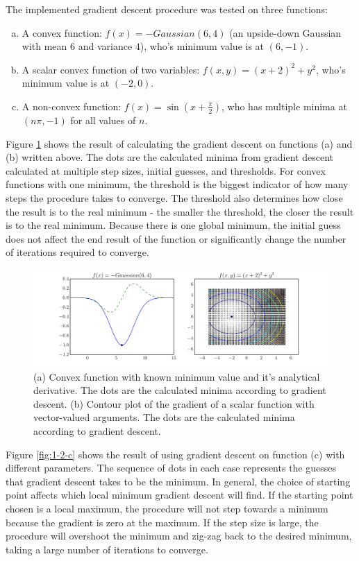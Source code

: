 \documentclass[10pt]{article}
\begin{document}
The implemented gradient descent procedure was tested on three functions: 
\begin{enumerate}[(a)]
	\item A convex function: $f(x) = -Gaussian(6, 4)$ (an upside-down Gaussian with mean $6$ and variance $4$), who's minimum value is at $(6, -1)$. 
	\item A scalar convex function of two variables: $f(x, y) = (x + 2)^2 + y^2$, who's minimum value is at $(-2, 0)$.
	\item A non-convex function: $f(x) = \sin(x + \frac{\pi}{2})$, who has multiple minima at $(n \pi, -1)$ for all values of $n$.
\end{enumerate}

Figure \ref{fig:1-2-ab} shows the result of calculating the gradient descent on functions (a) and (b) written above. The dots are the calculated minima from gradient descent calculated at multiple step sizes, initial guesses, and thresholds. For convex functions with one minimum, the threshold is the biggest indicator of how many steps the procedure takes to converge. The threshold also determines how close the result is to the real minimum - the smaller the threshold, the closer the result is to the real minimum. Because there is one global minimum, the initial guess does not affect the end result of the function or significantly change the number of iterations required to converge.

\begin{figure}[!ht]
	\centering
	\includegraphics[width=.66\textwidth]{exercise1-2-ab.pdf}
	\caption{(a) Convex function with known minimum value and it's analytical derivative. The dots are the calculated minima according to gradient descent. (b) Contour plot of the gradient of a scalar function with vector-valued arguments. The dots are the calculated minima according to gradient descent.}
	\label{fig:1-2-ab}
\end{figure}

Figure \ref{fig:1-2-c} shows the result of using gradient descent on function (c) with different parameters. The sequence of dots in each case represents the guesses that gradient descent takes to be the minimum. In general, the choice of starting point affects which local minimum gradient descent will find. If the starting point chosen is a local maximum, the procedure will not step towards a minimum because the gradient is zero at the maximum. If the step size is large, the procedure will overshoot the minimum and zig-zag back to the desired minimum, taking a large number of iterations to converge. 
\end{document}
